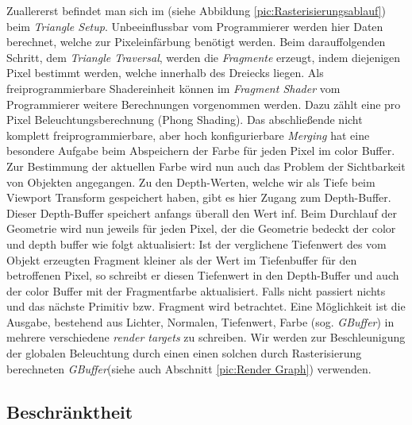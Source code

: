 \vspace*{3cm}        
Zuallererst befindet man sich im (siehe Abbildung \ref{pic:Rasterisierungsablauf}) beim \textit{Triangle Setup}. 
Unbeeinflussbar vom Programmierer werden hier Daten berechnet, welche zur Pixeleinfärbung
benötigt werden. Beim darauffolgenden Schritt, dem \textit{Triangle Traversal}, werden die \textit{Fragmente} erzeugt, indem diejenigen Pixel bestimmt werden, welche innerhalb des Dreiecks liegen. 
Als freiprogrammierbare Shadereinheit können im \textit{Fragment Shader} vom Programmierer weitere Berechnungen vorgenommen werden. Dazu zählt eine pro Pixel Beleuchtungsberechnung (Phong Shading).
Das abschließende nicht komplett freiprogrammierbare, aber hoch konfigurierbare \textit{Merging} hat eine besondere Aufgabe beim Abspeichern der Farbe für
jeden Pixel im color Buffer. Zur Bestimmung der aktuellen Farbe wird nun auch das Problem der Sichtbarkeit von Objekten angegangen. Zu den Depth-Werten, welche wir als Tiefe beim 
Viewport Transform gespeichert haben, gibt es hier Zugang zum Depth-Buffer. Dieser Depth-Buffer speichert anfangs überall den Wert inf. Beim Durchlauf der Geometrie wird nun jeweils für jeden Pixel,
der die Geometrie bedeckt der color und depth buffer wie folgt aktualisiert: Ist der verglichene Tiefenwert des vom Objekt erzeugten Fragment kleiner als der Wert
im Tiefenbuffer für den betroffenen Pixel, so schreibt er diesen Tiefenwert in den Depth-Buffer und auch der color Buffer mit der Fragmentfarbe aktualisiert.
Falls nicht passiert nichts und das nächste Primitiv bzw. Fragment wird betrachtet. 
Eine Möglichkeit ist die Ausgabe, bestehend aus Lichter, Normalen, Tiefenwert, Farbe (sog. \textit{GBuffer}) in mehrere verschiedene \textit{render targets} zu schreiben. 
Wir werden zur Beschleunigung der globalen Beleuchtung durch einen  einen solchen durch Rasterisierung berechneten \textit{GBuffer}(siehe auch
Abschnitt \ref{pic:Render Graph}) verwenden.
\vfill

\subsection{Beschränktheit}
\label{sec:Rasterisierung:Beschränktheit}

